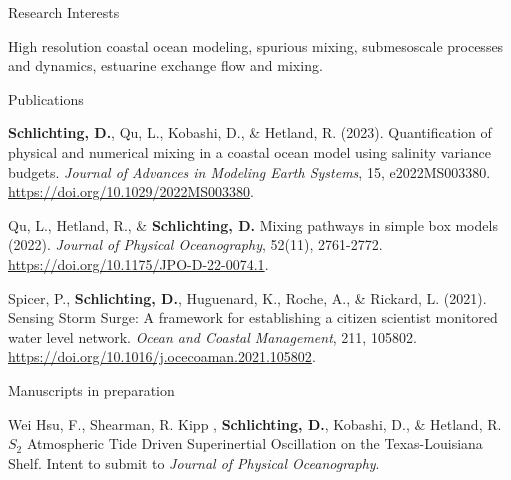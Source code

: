 \documentclass{resume} %
\begin{document}
\vspace{-3pt}

\begin{rSection}{Research Interests}
\vspace{-10pt}
\item High resolution coastal ocean modeling, spurious mixing, submesoscale processes and dynamics, estuarine exchange flow and mixing.

\end{rSection}

\begin{rSection}{Publications}
\vspace{-3pt}

\begin{etaremune}
\item \textbf{Schlichting, D.}, Qu, L., Kobashi, D., \& Hetland, R. (2023). Quantification of physical and numerical mixing in a coastal ocean model using salinity variance budgets. \textit{Journal of Advances in Modeling Earth Systems},
15, e2022MS003380. \url{https://doi.org/10.1029/2022MS003380}.
\item Qu, L., Hetland, R., \& \textbf{Schlichting, D.} Mixing pathways in simple box models (2022). \textit{Journal of Physical Oceanography}, 52(11), 2761-2772. \url{https://doi.org/10.1175/JPO-D-22-0074.1}.
\item Spicer, P., \textbf{Schlichting, D.}, Huguenard, K., Roche, A., \& Rickard, L. (2021). Sensing Storm Surge: A framework for establishing a citizen scientist monitored water level network. \textit{Ocean and Coastal Management}, 211, 105802. \url{https://doi.org/10.1016/j.ocecoaman.2021.105802}.
\end{etaremune}
\end{rSection}

\begin{rSection}{Manuscripts in preparation}
\vspace{-3pt}
\begin{etaremune}
\item Wei Hsu, F., Shearman, R. Kipp , \textbf{Schlichting, D.}, Kobashi, D., \& Hetland, R. $S_2$ Atmospheric Tide Driven Superinertial Oscillation on the Texas-Louisiana Shelf. Intent to submit to \textit{Journal of Physical Oceanography}.
\end{etaremune}
\end{rSection}
\end{document}
